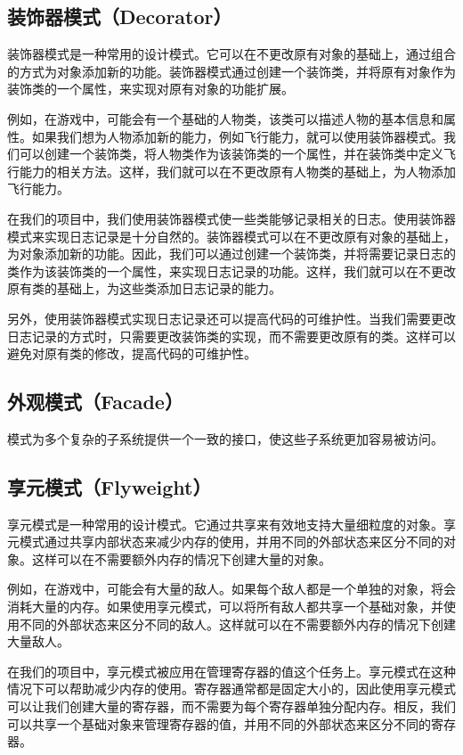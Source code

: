 \documentclass[cn,black,12pt,normal]{elegantnote}
\begin{document}
\subsection{装饰器模式（Decorator）}

装饰器模式是一种常用的设计模式。它可以在不更改原有对象的基础上，通过组合的方式为对象添加新的功能。装饰器模式通过创建一个装饰类，并将原有对象作为装饰类的一个属性，来实现对原有对象的功能扩展。

例如，在游戏中，可能会有一个基础的人物类，该类可以描述人物的基本信息和属性。如果我们想为人物添加新的能力，例如飞行能力，就可以使用装饰器模式。我们可以创建一个装饰类，将人物类作为该装饰类的一个属性，并在装饰类中定义飞行能力的相关方法。这样，我们就可以在不更改原有人物类的基础上，为人物添加飞行能力。

在我们的项目中，我们使用装饰器模式使一些类能够记录相关的日志。使用装饰器模式来实现日志记录是十分自然的。装饰器模式可以在不更改原有对象的基础上，为对象添加新的功能。因此，我们可以通过创建一个装饰类，并将需要记录日志的类作为该装饰类的一个属性，来实现日志记录的功能。这样，我们就可以在不更改原有类的基础上，为这些类添加日志记录的能力。

另外，使用装饰器模式实现日志记录还可以提高代码的可维护性。当我们需要更改日志记录的方式时，只需要更改装饰类的实现，而不需要更改原有的类。这样可以避免对原有类的修改，提高代码的可维护性。

\subsection{外观模式（Facade）}

模式为多个复杂的子系统提供一个一致的接口，使这些子系统更加容易被访问。

\subsection{享元模式（Flyweight）}

享元模式是一种常用的设计模式。它通过共享来有效地支持大量细粒度的对象。享元模式通过共享内部状态来减少内存的使用，并用不同的外部状态来区分不同的对象。这样可以在不需要额外内存的情况下创建大量的对象。

例如，在游戏中，可能会有大量的敌人。如果每个敌人都是一个单独的对象，将会消耗大量的内存。如果使用享元模式，可以将所有敌人都共享一个基础对象，并使用不同的外部状态来区分不同的敌人。这样就可以在不需要额外内存的情况下创建大量敌人。

在我们的项目中，享元模式被应用在管理寄存器的值这个任务上。享元模式在这种情况下可以帮助减少内存的使用。寄存器通常都是固定大小的，因此使用享元模式可以让我们创建大量的寄存器，而不需要为每个寄存器单独分配内存。相反，我们可以共享一个基础对象来管理寄存器的值，并用不同的外部状态来区分不同的寄存器。
\end{document}
